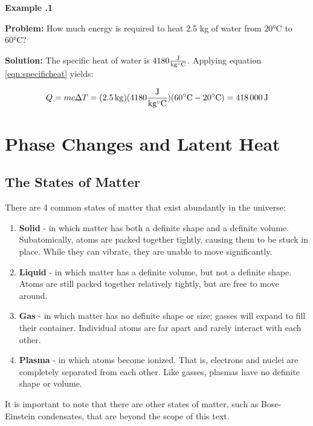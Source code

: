 	
	\begin{mdframed}[backgroundcolor=blue!10!white]
		\begin{center}
			
			
			\textbf{Example \thesection.1}	
		\end{center}
		
		\textbf{Problem: } How much energy is required to heat 2.5 kg of water from $20 \si{\degreeCelsius}$ to $60 \si{\degreeCelsius}$?
				
		\vspace{0.1in}
		
		\textbf{Solution:} The specific heat of water is $4180 \si{\frac{J}{kg \degreeCelsius}} $.  Applying equation \ref{eqn:specificheat} yields:
		
		\begin{equation*}
			Q = m c \Delta T = (\SI{2.5}{kg}) (4180 \si{\frac{J}{kg \degreeCelsius}}) (60 \si{\degreeCelsius} - 20 \si{\degreeCelsius})= \SI{418000}{J} 
		\end{equation*}
	\end{mdframed}
	
	\section{Phase Changes and Latent Heat}
	\subsection {The States of Matter}
		There are 4 common states of matter that exist abundantly in the universe:
		\begin{enumerate}
			\item \textbf{Solid} - in which matter has both a definite shape and a definite volume.  Subatomically, atoms are packed together tightly, causing them to be stuck in place.  While they can vibrate, they are unable to move significantly.  
			\item \textbf{Liquid} - in which matter has a definite volume, but not a definite shape.  Atoms are still packed together relatively tightly, but are free to move around. 
			\item \textbf{Gas} - in which matter has no definite shape or size; gasses will expand to fill their container.  Individual atoms are far apart and rarely interact with each other.  
			\item \textbf{Plasma} - in which atoms become ionized.  That is, electrons and nuclei are completely separated from each other.  Like gasses, plasmas have no definite shape or volume.  
		\end{enumerate}
		It is important to note that there are other states of matter, such as Bose-Einstein condensates, that are beyond the scope of this text.  
		
